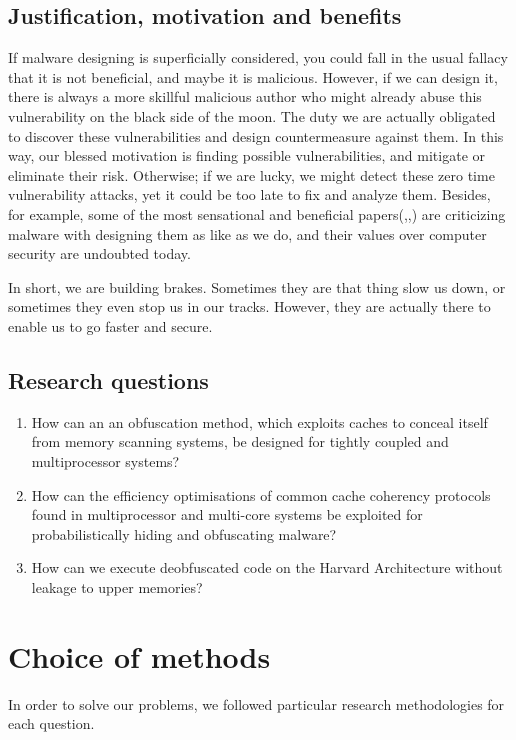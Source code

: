 \subsection{Justification, motivation and benefits}
If malware designing is superficially considered, you could fall in the usual fallacy that it is not beneficial, and maybe it is malicious. However, if we can design it, there is always a more skillful malicious author who might already abuse this vulnerability on the black side of the moon. The duty we are actually obligated to discover these vulnerabilities and design countermeasure against them. In this way, our blessed motivation is finding possible vulnerabilities, and mitigate or eliminate their risk. Otherwise; if we are lucky, we might detect these zero time vulnerability attacks, yet it could be too late to fix and analyze them. Besides, for example, some of the most sensational and beneficial papers(\cite{moser2007limits},\cite{cavallaro2008limits},\cite{egele2012survey}) are criticizing malware with designing them as like as we do, and their values over computer security are undoubted today. 

In short, we are building brakes. Sometimes they are that thing slow us down, or sometimes they even stop us in our tracks. However, they are actually there to enable us to go faster and secure.

\subsection{Research questions}\label{research:questions}
\begin{enumerate}
	\item How can an an obfuscation method, which exploits caches to conceal itself from memory scanning systems, be designed for tightly coupled and multiprocessor systems?
	\item How can the efficiency optimisations of common cache coherency protocols found in multiprocessor and multi-core systems be exploited for probabilistically hiding and obfuscating malware?
	\item How can we execute deobfuscated code on the Harvard Architecture without leakage to upper memories?
\end{enumerate}


\section{Choice of methods}
	In order to solve our problems, we followed particular research methodologies for each question.

